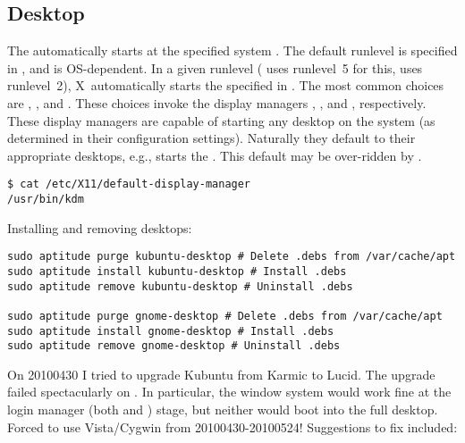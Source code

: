 \documentclass[12pt,twoside]{article}
\begin{document}
\subsection{Desktop}\label{sxn:dsk}
The  automatically starts at the specified system
.
The default runlevel is specified in , and is
OS-dependent. 
In a given runlevel ( uses runlevel~5 for this,
 uses runlevel~2), X~automatically starts the
 specified in
. 
The most common choices are , , and
.
These choices invoke the display managers , ,
and , respectively. 
These display managers are capable of starting any desktop on the
system (as determined in their configuration settings).
Naturally they default to their appropriate desktops, e.g.,
 starts the .
This default may be over-ridden by
.
\begin{verbatim}
$ cat /etc/X11/default-display-manager 
/usr/bin/kdm
\end{verbatim}
Installing and removing desktops:
\begin{verbatim}
sudo aptitude purge kubuntu-desktop # Delete .debs from /var/cache/apt
sudo aptitude install kubuntu-desktop # Install .debs
sudo aptitude remove kubuntu-desktop # Uninstall .debs

sudo aptitude purge gnome-desktop # Delete .debs from /var/cache/apt
sudo aptitude install gnome-desktop # Install .debs
sudo aptitude remove gnome-desktop # Uninstall .debs
\end{verbatim}
On 20100430 I tried to upgrade Kubuntu from Karmic to Lucid.
The upgrade failed spectacularly on .
In particular, the  window system would work fine at the
login manager (both  and ) stage, but
neither would boot into the full desktop.
Forced to use Vista/Cygwin from 20100430-20100524!
Suggestions to fix included: 
\end{document}

